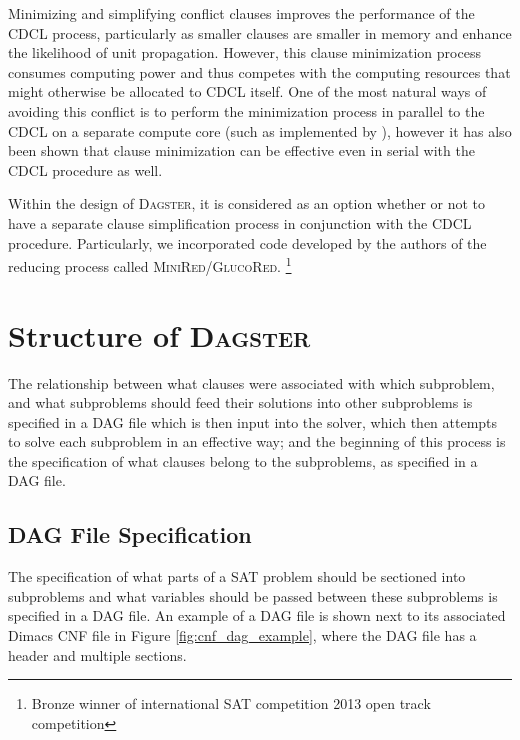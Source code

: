 \documentclass[
10pt, %
a4paper, %
oneside, %
headinclude,footinclude, %
BCOR5mm, %
]{scrartcl}
\begin{document}
Minimizing and simplifying conflict clauses improves the performance of the CDCL process, particularly as smaller clauses are smaller in memory and enhance the likelihood of unit propagation.
However, this clause minimization process consumes computing power and thus competes with the computing resources that might otherwise be allocated to CDCL itself.
One of the most natural ways of avoiding this conflict is to perform the minimization process in parallel to the CDCL on a separate compute core (such as implemented by \cite{DBLP:conf/sat/WieringaH13}), however it has also been shown that clause minimization can be effective even in serial with the CDCL procedure as well.\cite{ijcai2017-98}

Within the design of \textsc{Dagster}, it is considered as an option whether or not to have a separate clause simplification process in conjunction with the CDCL procedure.
Particularly, we incorporated code developed by the authors of \cite{DBLP:conf/sat/WieringaH13} the reducing process called \textsc{MiniRed/GlucoRed}. 
\footnote{Bronze winner of international SAT competition 2013 open track competition}


\section{Structure of \textsc{Dagster}}


The relationship between what clauses were associated with which subproblem, and what subproblems should feed their solutions into other subproblems is specified in a DAG file which is then input into the solver, which then attempts to solve each subproblem in an effective way; and the beginning of this process is the specification of what clauses belong to the subproblems, as specified in a DAG file.


\subsection{DAG File Specification}\label{sec:dag_file}

The specification of what parts of a SAT problem should be sectioned into subproblems and what variables should be passed between these subproblems is specified in a DAG file.
An example of a DAG file is shown next to its associated Dimacs CNF file in Figure \ref{fig:cnf_dag_example}, where the DAG file has a header and multiple sections.
\end{document}
